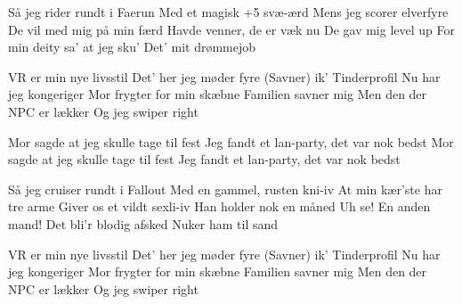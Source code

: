 \documentclass[a4paper,11pt]{article}
\begin{document}
\begin{song}
%
Så jeg rider rundt i Faerun
Med et magisk +5 svæ-ærd
Mens jeg scorer elverfyre
De vil med mig på min færd
Havde venner, de er væk nu
De gav mig level up
For min deity sa' at jeg sku'
 Det' mit drømmejob

VR er min nye livsstil
Det' her jeg møder fyre
(Savner) ik' Tinderprofil
Nu har jeg kongeriger
Mor frygter for min skæbne
Familien savner mig
Men den der NPC er lækker
Og jeg swiper right

%
Mor sagde at jeg skulle tage til fest
Jeg fandt et lan-party, det var nok bedst
%
Mor sagde at jeg skulle tage til fest
Jeg fandt et lan-party, det var nok bedst

%
Så jeg cruiser rundt i Fallout
Med en gammel, rusten kni-iv
At min kær'ste har tre arme
Giver os et vildt sexli-iv
Han holder nok en måned
Uh se! En anden mand!
Det bli'r blodig afsked
 Nuker ham til sand

VR er min nye livsstil
Det' her jeg møder fyre
(Savner) ik' Tinderprofil
Nu har jeg kongeriger
Mor frygter for min skæbne
Familien savner mig
Men den der NPC er lækker
Og jeg swiper right

\end{song}
\end{document}
